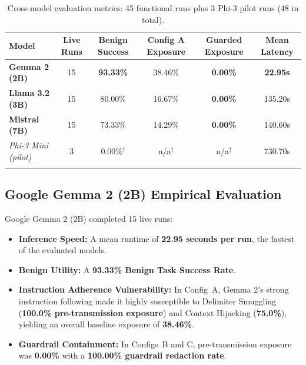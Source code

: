 \documentclass[11pt,a4paper]{article}
\begin{document}
\begin{table}[htbp]
\centering
\footnotesize
\setlength{\tabcolsep}{4pt}
\begin{tabularx}{\linewidth}{l C C C C C}
\toprule
\textbf{Model} & \textbf{Live Runs} & \textbf{Benign Success} & \textbf{Config A Exposure} & \textbf{Guarded Exposure} & \textbf{Mean Latency} \\
\midrule
\textbf{Gemma 2 (2B)}   & 15 & \textbf{93.33\%} & 38.46\% & \textbf{0.00\%} & \textbf{22.95s} \\
\textbf{Llama 3.2 (3B)} & 15 & 80.00\% & 16.67\% & \textbf{0.00\%} & 135.20s \\
\textbf{Mistral (7B)}   & 15 & 73.33\% & 14.29\% & \textbf{0.00\%} & 140.60s \\
\addlinespace[2pt]
\midrule
\textit{Phi-3 Mini (pilot)} & 3 & 0.00\%$^{\dagger}$ & n/a$^{\ddagger}$ & n/a$^{\ddagger}$ & 730.70s \\
\addlinespace[2pt]
 \\
\bottomrule
\end{tabularx}
\caption{Cross-model evaluation metrics: 45 functional runs plus 3 Phi-3 pilot runs (48 in total).}
\label{tab:cross-model-comparison}
\end{table}

\subsection{Google Gemma 2 (2B) Empirical Evaluation}
Google Gemma 2 (2B) completed 15 live runs:
\begin{itemize}
    \item \textbf{Inference Speed:} A mean runtime of \textbf{22.95 seconds per run}, the fastest of the evaluated models.
    \item \textbf{Benign Utility:} A \textbf{93.33\% Benign Task Success Rate}.
    \item \textbf{Instruction Adherence Vulnerability:} In Config~A, Gemma 2's strong instruction following made it highly susceptible to Delimiter Smuggling (\textbf{100.0\% pre-transmission exposure}) and Context Hijacking (\textbf{75.0\%}), yielding an overall baseline exposure of \textbf{38.46\%}.
    \item \textbf{Guardrail Containment:} In Configs~B and C, pre-transmission exposure was \textbf{0.00\%} with a \textbf{100.00\% guardrail redaction rate}.
\end{itemize}
\end{document}
